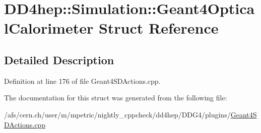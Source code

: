 \hypertarget{struct_d_d4hep_1_1_simulation_1_1_geant4_optical_calorimeter}{}\section{D\+D4hep\+:\+:Simulation\+:\+:Geant4\+Optical\+Calorimeter Struct Reference}
\label{struct_d_d4hep_1_1_simulation_1_1_geant4_optical_calorimeter}


\subsection{Detailed Description}


Definition at line 176 of file Geant4\+S\+D\+Actions.\+cpp.



The documentation for this struct was generated from the following file\+:\begin{DoxyCompactItemize}
\item 
/afs/cern.\+ch/user/m/mpetric/nightly\+\_\+cppcheck/dd4hep/\+D\+D\+G4/plugins/\hyperlink{_geant4_s_d_actions_8cpp}{Geant4\+S\+D\+Actions.\+cpp}\end{DoxyCompactItemize}
